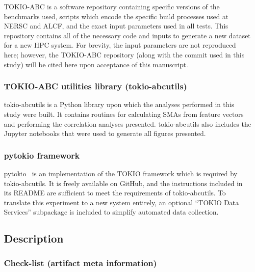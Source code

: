 TOKIO-ABC is a software repository containing specific versions of the benchmarks used, scripts which encode the specific build processes used at NERSC and ALCF, and the exact input parameters used in all tests.
This repository contains all of the necessary code and inputs to generate a new dataset for a new HPC system.
For brevity, the input parameters are not reproduced here; however, the TOKIO-ABC repository (along with the commit used in this study) will be cited here upon acceptance of this manuscript.

\subsubsection{TOKIO-ABC utilities library (tokio-abcutils)}

tokio-abcutils is a Python library upon which the analyses performed in this study were built.
It contains routines for calculating SMAs from feature vectors and performing the correlation analyses presented.
tokio-abcutils also includes the Jupyter notebooks that were used to generate all figures presented.

\subsubsection{pytokio framework}

pytokio~\cite{Lockwood2018tokio} is an implementation of the TOKIO framework which is required by tokio-abcutils.
It is freely available on GitHub, and the instructions included in its README are sufficient to meet the requirements of tokio-abcutils.
To translate this experiment to a new system entirely, an optional ``TOKIO Data Services'' subpackage is included to simplify automated data collection.

\subsection{Description}

\subsubsection{Check-list (artifact meta information)}

